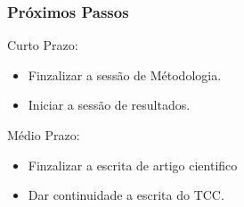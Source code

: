 \documentclass[aspectratio=169]{beamer}
\begin{document}
\begin{frame}
    \frametitle{Próximos Passos}

    \begin{block}{Curto Prazo:}

        \begin{itemize}
            \item Finzalizar a sessão de Métodologia.
            \item Iniciar a sessão de resultados.


        \end{itemize}

    \end{block}



    \begin{block}{Médio Prazo:}

        \begin{itemize}
            \item \color{blue} Finzalizar a escrita de artigo cientifico
            \item \color{blue} Dar continuidade a escrita do TCC.
        \end{itemize}

    \end{block}




\end{frame}













\end{document}

